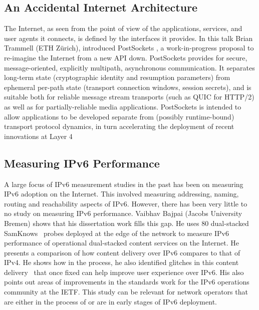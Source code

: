\subsection{An Accidental Internet Architecture}

The Internet, as seen from the point of view of the applications, services,
and user agents it connects, is defined by the interfaces it provides. In this talk Brian
Trammell (ETH Zürich), introduced PostSockets
\cite{draft-trammell-post-sockets}, a work-in-progress proposal to re-imagine
the Internet from a new API down. PostSockets provides for secure,
message-oriented, explicitly multipath, asynchronous communication.  It
separates long-term state (cryptographic identity and resumption parameters)
from ephemeral per-path state (transport connection windows, session secrets),
and is suitable both for reliable message stream transports (such as QUIC for
HTTP/2) as well as for partially-reliable media applications. PostSockets is
intended to allow applications to be developed separate from (possibly
runtime-bound) transport protocol dynamics, in turn accelerating the
deployment of recent innovations at Layer 4

\subsection{Measuring IPv6 Performance}

A large focus of IPv6 measurement studies in the past has been on measuring
IPv6 adoption on the Internet. This involved measuring addressing, naming,
routing and reachability aspects of IPv6.  However, there has been very little
to no study on measuring IPv6 performance. Vaibhav Bajpai (Jacobs University
Bremen) shows that his dissertation work fills this gap. He uses 80
dual-stacked SamKnows~\cite{vbajpai:comst:2015} probes deployed at the edge of
the network to measure IPv6 performance of operational dual-stacked content
services on the Internet.  He presents a comparison of how content delivery
\cite{vbajpai:networking:2015, sahsan:pam:2015} over IPv6 compares to that of
IPv4. He shows how in the process, he also identified glitches in this content
delivery~\cite{seravuchira:cnsm:2016} that once fixed can help improve user
experience over IPv6. His also points out areas of improvements
\cite{vbajpai:anrw:2016} in the standards work for the IPv6 operations
community at the IETF\@. This study can be relevant for network operators that
are either in the process of or are in early stages of IPv6 deployment.


